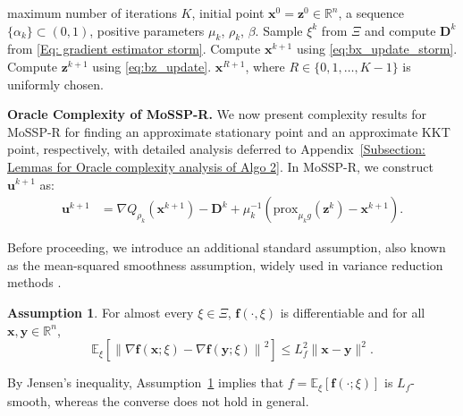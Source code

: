 \documentclass{article}
\theoremstyle{plain}
\theoremstyle{definition}
\newtheorem{assumption}{Assumption}[section]
\theoremstyle{remark}
\newcommand{\RR}{\mathbb{R}}
\newcommand{\EE}{\mathbb{E}}
\newcommand{\prox}{\mathrm{prox}}
\newcommand{\bx}{\bm{x}}
\newcommand{\bu}{\bm{u}}
\newcommand{\bz}{\bm{z}}
\newcommand{\by}{\bm{y}}
\newcommand{\bD}{\bm{D}}
\newcommand{\tf}{\mathbf{f}}
\numberwithin{equation}{section}
\begin{document}
\begin{algorithm}[t]
    \caption{\textbf{MoSSP-R}: \textbf{S}ingle-Loop \textbf{S}tochastic \textbf{P}enalty Algorithm with \textbf{R}ecursive \textbf{Mo}mentum}
    \label{alg:mossp-r}
    \begin{algorithmic}
         maximum number of iterations $K$, initial point $\bx^{0} = \bz^{0} \in \RR^{n}$, a sequence $\{\alpha_k\}\subset(0,1)$, positive parameters $\mu_k$, $\rho_k$, $\beta$.
        \STATE Sample $\xi^k$ from $\Xi$ and compute $\bD^{k}$ from \eqref{Eq: gradient estimator storm}.
        \STATE Compute $\bx^{k+1}$ using \eqref{eq:bx_update_storm}.
        \STATE Compute $\bz^{k+1}$ using \eqref{eq:bz_update}.
        \ENDFOR
         $\bx^{R+1}$, where $R \in \{0,1,\ldots,K-1\}$ is uniformly chosen.
    \end{algorithmic}
\end{algorithm}
\noindent\textbf{Oracle Complexity of MoSSP-R.}\; We now present complexity results for MoSSP-R for finding an approximate stationary point and an approximate KKT point, respectively, with detailed analysis deferred to Appendix~\ref{Subsection: Lemmas for Oracle complexity analysis of Algo 2}. In MoSSP-R, we construct $\bu^{k+1}$ as:
{
\begin{equation}
\label{Eq: u-define-stochastic-storm}
\begin{aligned}
\bu^{k+1}
&= {\nabla Q_{\rho_k}(\bx^{k+1}) - \bD^k} + \mu_k^{-1}(\prox_{\mu_k g}(\bz^k)- \bx^{k+1}).
\end{aligned}
\end{equation}}

Before proceeding, we introduce an additional standard assumption, also known as the mean-squared smoothness assumption, widely used in variance reduction methods \cite{nguyen2017sarah,fang2018spider,cutkosky2019momentum,xu2023momentum}.
\begin{assumption}
    \label{Ass: the expected smoothness of f} 
    For almost every $\xi \in \Xi$, $\tf(\cdot, \xi)$ is differentiable and 
    for all $\bx, \by \in \RR^{n}$,
    \[
        \EE_{\xi}\left[\left\|\nabla \tf(\bx; \xi) - \nabla \tf(\by; \xi)\right\|^{2}
        \right] \leq L_f^{2}\|\bx - \by\|^{2}.
    \]
\end{assumption}  
By Jensen's inequality, Assumption~\ref{Ass: the expected smoothness of f} implies that 
\(f=\EE_{\xi}[\tf(\cdot;\xi)]\) is \(L_f\)-smooth, whereas the converse does not hold in general.
\end{document}
